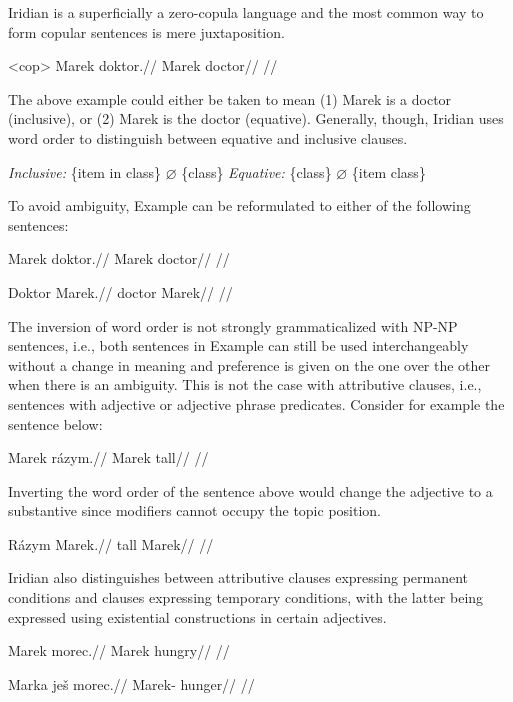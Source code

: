 Iridian is a superficially a zero-copula language and the most common way to form copular sentences is mere juxtaposition.

\pex<cop>
\begingl
\gla Marek doktor.//
\glb Marek doctor//
\glft {}//
\endgl
\xe

The above example could either be taken to mean (1) Marek is a doctor (inclusive), or (2) Marek is the doctor (equative). Generally, though, Iridian uses word order to distinguish between equative and inclusive clauses.

\pex
\a \textit{Inclusive:} \{item in class\} $\varnothing$ \{class\}
\a \textit{Equative:} \{class\} $\varnothing$ \{item class\}
\xe

To avoid ambiguity, Example  can be reformulated to either of the following sentences:

\a
\begingl
\gla Marek doktor.//
\glb Marek doctor//
\glft {}//
\endgl

\a
\begingl
\gla Doktor Marek.//
\glb doctor Marek//
\glft {}//
\endgl

\xe

The inversion of word order is not strongly grammaticalized with NP-NP sentences, i.e., both sentences in Example  can still be used interchangeably without a change in meaning and preference is given on the one over the other when there is an ambiguity. This is not the case with attributive clauses, i.e., sentences with adjective or adjective phrase predicates. Consider for example the sentence below:

\pex
\begingl
\gla Marek rázym.//
\glb Marek tall//
\glft {}//
\endgl
\xe

Inverting the word order of the sentence above would change the adjective to a substantive since modifiers cannot occupy the topic position.

\pex
\begingl
\gla Rázym Marek.//
\glb tall Marek//
\glft {}//
\endgl
\xe

Iridian also distinguishes between attributive clauses expressing permanent conditions and clauses expressing temporary conditions, with the latter being expressed using existential constructions in certain adjectives.

\pex
\begingl
\gla *Marek morec.//
\glb Marek hungry//
\glft {}//
\endgl
\xe


\pex
\begingl
\gla Marka ješ morec.//
\glb Marek-\Pat{} \Exst{} hunger//
\glft {}//
\endgl
\xe

